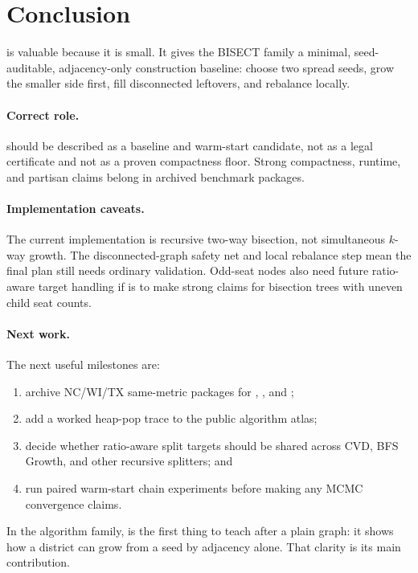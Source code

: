 \section{Conclusion}
\label{sec:conclusion}

\bfsg{} is valuable because it is small. It gives the BISECT family a
minimal, seed-auditable, adjacency-only construction baseline: choose two
spread seeds, grow the smaller side first, fill disconnected leftovers, and
rebalance locally.

\paragraph{Correct role.}
\bfsg{} should be described as a baseline and warm-start candidate, not as a
legal certificate and not as a proven compactness floor. Strong compactness,
runtime, and partisan claims belong in archived benchmark packages.

\paragraph{Implementation caveats.}
The current implementation is recursive two-way bisection, not simultaneous
$k$-way growth. The disconnected-graph safety net and local rebalance step mean
the final plan still needs ordinary validation. Odd-seat nodes also need future
ratio-aware target handling if \bfsg{} is to make strong claims for bisection
trees with uneven child seat counts.

\paragraph{Next work.}
The next useful milestones are:
\begin{enumerate}
\item archive NC/WI/TX same-metric packages for \bfsg{}, \metis{}, and \cvd{};
\item add a worked heap-pop trace to the public algorithm atlas;
\item decide whether ratio-aware split targets should be shared across CVD,
  BFS Growth, and other recursive splitters; and
\item run paired warm-start chain experiments before making any MCMC
  convergence claims.
\end{enumerate}

In the algorithm family, \bfsg{} is the first thing to teach after a plain
graph: it shows how a district can grow from a seed by adjacency alone. That
clarity is its main contribution.

